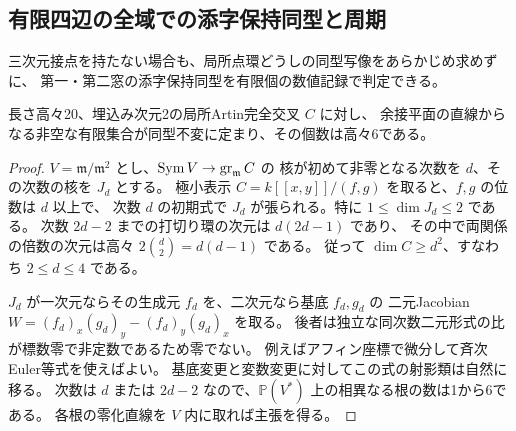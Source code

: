\subsection{有限四辺の全域での添字保持同型と周期}
\label{sec:planar-point-flags}
三次元接点を持たない場合も、局所点環どうしの同型写像をあらかじめ求めずに、
第一・第二窓の添字保持同型を有限個の数値記録で判定できる。

\begin{lemma}\label{lem:planar-point-wronskian}
長さ高々20、埋込み次元2の局所Artin完全交叉 $C$ に対し、
余接平面の直線からなる非空な有限集合が同型不変に定まり、その個数は高々6である。
\end{lemma}
\begin{proof}
$V=\mathfrak m/\mathfrak m^2$ とし、$\operatorname{Sym} V\to\operatorname{gr}_{\mathfrak m} C$ の
核が初めて非零となる次数を $d$、その次数の核を $J_d$ とする。
極小表示 $C=k[[x,y]]/(f,g)$ を取ると、$f,g$ の位数は $d$ 以上で、
次数 $d$ の初期式で $J_d$ が張られる。特に $1\le\dim J_d\le2$ である。
次数 $2d-2$ までの打切り環の次元は $d(2d-1)$ であり、
その中で両関係の倍数の次元は高々 $2\binom d2=d(d-1)$ である。
従って $\dim C\ge d^2$、すなわち $2\le d\le4$ である。

$J_d$ が一次元ならその生成元 $f_d$ を、二次元なら基底 $f_d,g_d$ の
二元Jacobian $W=(f_d)_x(g_d)_y-(f_d)_y(g_d)_x$ を取る。
後者は独立な同次数二元形式の比が標数零で非定数であるため零でない。
例えばアフィン座標で微分して斉次Euler等式を使えばよい。
基底変更と変数変更に対してこの式の射影類は自然に移る。
次数は $d$ または $2d-2$ なので、$\mathbb P(V^*)$ 上の相異なる根の数は1から6である。
各根の零化直線を $V$ 内に取れば主張を得る。
\end{proof}

